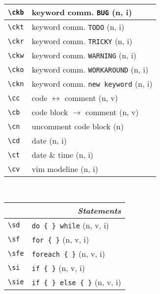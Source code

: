 \documentclass[oneside,10pt,landscape,DIV17]{scrartcl}
\begin{document}
\begin{multicols}{3}
\begin{center}
\begin{tabular}[]{|p{11mm}|p{58mm}|}
\hline \verb'\ckb'  & keyword comm. \verb'BUG'          \hfill (n, i)   \\
\hline \verb'\ckt'  & keyword comm. \verb'TODO'         \hfill (n, i)   \\
\hline \verb'\ckr'  & keyword comm. \verb'TRICKY'       \hfill (n, i)   \\
\hline \verb'\ckw'  & keyword comm. \verb'WARNING'      \hfill (n, i)   \\
\hline \verb'\cko'  & keyword comm. \verb'WORKAROUND'   \hfill (n, i)   \\
\hline \verb'\ckn'  & keyword comm. \verb'new keyword'  \hfill (n, i)   \\
\hline \verb'\cc'   & code $\leftrightarrow$ comment    \hfill (n, v)   \\
\hline \verb'\cb'   & code block $\rightarrow$ comment  \hfill (n, v)   \\
\hline \verb'\cn'   & uncomment code block              \hfill (n)      \\
\hline \verb'\cd'   & date                              \hfill (n, i)   \\
\hline \verb'\ct'   & date \& time                      \hfill (n, i)   \\
\hline \verb'\cv'   & vim modeline                      \hfill (n, i)   \\
\hline
\end{tabular}\\
%
%
\begin{tabular}[]{|p{18mm}|p{49mm}|}
\hline
\multicolumn{2}{|r|}{\textsl{\textbf{S}tatements}}                    \\[1.0ex]
\hline \verb'\sd'      & \verb'do { } while'          \hfill (n, v, i)\\
\hline \verb'\sf'      & \verb'for { }'               \hfill (n, v, i)\\
\hline \verb'\sfe'     & \verb'foreach { }'           \hfill (n, v, i)\\
\hline \verb'\si'      & \verb'if { }'                \hfill (n, v, i)\\
\hline \verb'\sie'     & \verb'if { } else { }'       \hfill (n, v, i)\\

\end{tabular}
\end{center}
\end{multicols}
\end{document}
